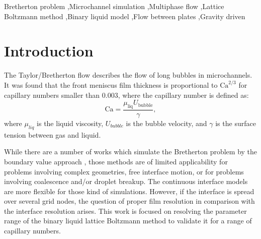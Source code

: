 \documentclass[preprint,12pt]{elsarticle}
\newcommand{\Ca}{\mathrm{Ca}}
\begin{document}
\begin{frontmatter}
\begin{keyword}
Bretherton problem \sep Microchannel simulation \sep Multiphase flow \sep Lattice Boltzmann method
\sep Binary liquid model \sep Flow between plates \sep Gravity driven

\end{keyword}

\end{frontmatter}

\linenumbers





\section{Introduction}
The Taylor/Bretherton \cite{bretherton} flow describes the flow of long bubbles in
microchannels. It was found that the front meniscus film thickness is proportional
to $\Ca^{2/3}$ for capillary numbers smaller than $0.003$, where the capillary number is defined as:
\begin{equation}
\label{capillary:number:definition}
\Ca=\frac{\mu_\mathrm{liq} U_\mathrm{bubble}}{\gamma},
\end{equation}
where $\mu_{liq}$ is the liquid viscosity, $U_{bubble}$ is the bubble velocity, and
$\gamma$ is the surface tension between gas and liquid.

While there are a number
of works which simulate the Bretherton problem by the boundary value approach
\cite{ingham-plates,heil-bretherton}, those methods are of limited applicability for problems
involving complex geometries, free interface motion, or for problems involving coalescence and/or
droplet breakup. The continuous interface models are more flexible for those kind of simulations.
However, if the interface is spread over several grid nodes, the question of
proper film resolution in comparison with the interface resolution arises.  This work is focused on
resolving the parameter range of the binary liquid lattice
Boltzmann method to validate it for a range of capillary numbers.
\end{document}
